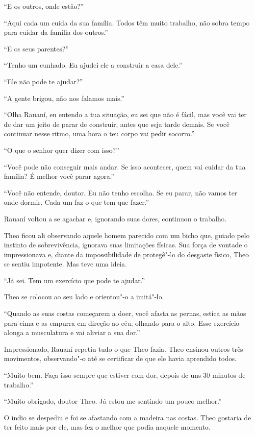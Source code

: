 ``E os outros, onde estão?''

``Aqui cada um cuida da sua família. Todos têm muito trabalho, não sobra
tempo para cuidar da família dos outros.''

``E os seus parentes?''

``Tenho um cunhado. Eu ajudei ele a construir a casa dele.''

``Ele não pode te ajudar?''

``A gente brigou, não nos falamos mais.''

``Olha Rauaní, eu entendo a tua situação, eu sei que não é fácil, mas
você vai ter de dar um jeito de parar de construir, antes que seja tarde
demais. Se você continuar nesse ritmo, uma hora o teu corpo vai pedir
socorro.''

``O que o senhor quer dizer com isso?''

``Você pode não conseguir mais andar. Se isso acontecer, quem vai cuidar
da tua família? É melhor você parar agora.''

``Você não entende, doutor. Eu não tenho escolha. Se eu parar, não vamos
ter onde dormir. Cada um faz o que tem que fazer.''

Rauaní voltou a se agachar e, ignorando suas dores, continuou o
trabalho.

Theo ficou ali observando aquele homem parecido com um bicho que, guiado
pelo instinto de sobrevivência, ignorava suas limitações físicas. Sua
força de vontade o impressionava e, diante da impossibilidade de
protegê"-lo do desgaste físico, Theo se sentiu impotente. Mas teve uma
ideia.

``Já sei. Tem um exercício que pode te ajudar.''

Theo se colocou ao seu lado e orientou"-o a imitá"-lo.

``Quando as suas costas começarem a doer, você afasta as pernas, estica
as mãos para cima e as empurra em direção ao céu, olhando para o alto.
Esse exercício alonga a musculatura e vai aliviar a sua dor.''

Impressionado, Rauaní repetiu tudo o que Theo fazia. Theo ensinou outros
três movimentos, observando"-o até se certificar de que ele havia
aprendido todos.

``Muito bem. Faça isso sempre que estiver com dor, depois de uns 30
minutos de trabalho.''

``Muito obrigado, doutor Theo. Já estou me sentindo um pouco melhor.''

O índio se despediu e foi se afastando com a madeira nas costas. Theo
gostaria de ter feito mais por ele, mas fez o melhor que podia naquele
momento.

